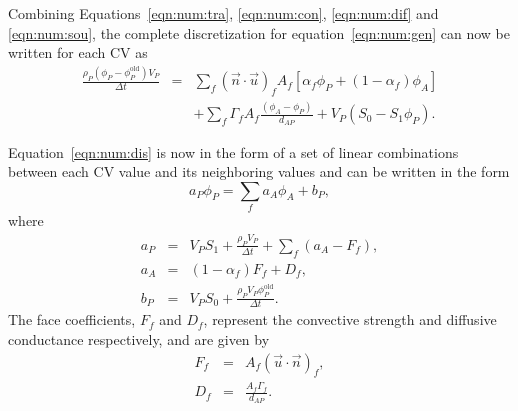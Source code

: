 Combining Equations~\eqref{eqn:num:tra}, \eqref{eqn:num:con},
\eqref{eqn:num:dif} and \eqref{eqn:num:sou}, the complete
discretization for equation~\eqref{eqn:num:gen} can now be written for
each CV as
\begin{eqnarray}
\frac{\rho_{P}(\phi_{P} - \phi_P^\text{old}) V_P}{\Delta t}
&=&
\sum_{f} (\vec{n} \cdot \vec{u})_f A_f 
\left[\alpha_f \phi_P +\left(1-\alpha_f\right)\phi_A\right]
\\
&&+
\sum_f \Gamma_f A_f \frac{(\phi_A-\phi_P)}{d_{AP}}
+ 
V_P ( S_0 - S_1 \phi_P ).
\label{eqn:num:dis}
\end{eqnarray}

Equation~\eqref{eqn:num:dis} is now in the form of a set of linear
combinations between each CV value and its neighboring values and can be
written in the form
\begin{equation}
a_P \phi_P = \sum_f a_{A} \phi_{A} + b_P,
\label{eqn:num:dap}
\end{equation}
where
\begin{eqnarray}
a_P & = & V_P S_1 + \frac{\rho_P V_P}{\Delta t} + \sum_f (a_{A} -
F_f), \\
a_{A} & = & ( 1 - \alpha_f ) F_f + D_f, \\
b_P & = & V_P S_0 + \frac{\rho_P V_P \phi_P^\text{old}}{\Delta t}.
\end{eqnarray}
The face coefficients, $F_f$ and $D_f$, represent the convective strength
and diffusive conductance respectively, and are given by
\begin{eqnarray}
F_f & = & A_f ( \vec{u} \cdot \vec{n} )_f, \\
D_f & = & \frac{A_f \Gamma_f}{d_{AP}} .
\end{eqnarray}












